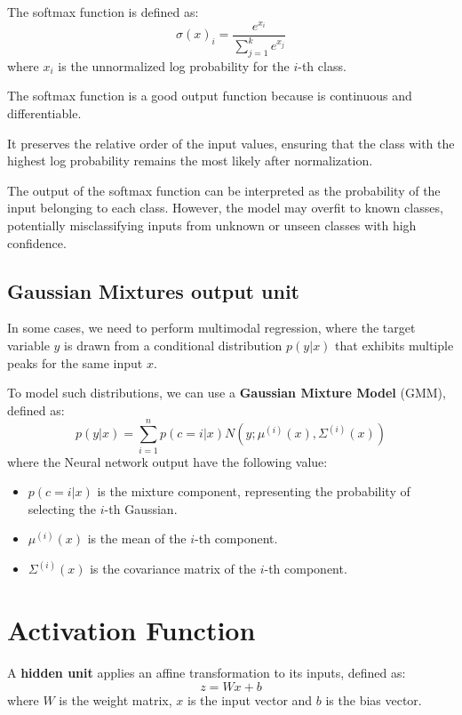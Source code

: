 The softmax function is defined as:
\begin{equation}
    \sigma(x)_i = \frac{e^{x_i}}{\sum_{j=1}^k e^{x_j}}
\end{equation}
where $x_i$ is the unnormalized log probability for the $i$-th class.

The softmax function is a good output function because is continuous and
differentiable.

It preserves the relative order of the input values, ensuring that the class with
the highest log probability remains the most likely after normalization.

The output of the softmax function can be interpreted as the probability of the
input belonging to each class. However, the model may overfit to known classes,
potentially misclassifying inputs from unknown or unseen classes with high confidence.
\subsection{Gaussian Mixtures output unit}
In some cases, we need to perform multimodal regression, where the target variable
$y$ is drawn from a conditional distribution $p(y|x)$ that exhibits multiple peaks
for the same input $x$.

To model such distributions, we can use a \textbf{Gaussian Mixture Model} (GMM),
defined as:
\begin{equation}
    p(y|x) = \sum_{i=1}^n p(c= i|x) N(y; \mu^{(i)}(x), \Sigma^{(i)}(x))
\end{equation}
where the Neural network output have the following value:
\begin{itemize}
    \item $p(c=i|x)$ is the mixture component, representing the probability of
          selecting the $i$-th Gaussian.
    \item $\mu^{(i)}(x)$ is the mean of the $i$-th component.
    \item $\Sigma^{(i)}(x)$ is the covariance matrix of the $i$-th component.
\end{itemize}
\section{Activation Function}
A \textbf{hidden unit} applies an affine transformation to its inputs, defined as:
\begin{equation}
    z = Wx + b
\end{equation}
where $W$ is the weight matrix, $x$ is the input vector and $b$ is the bias vector.


